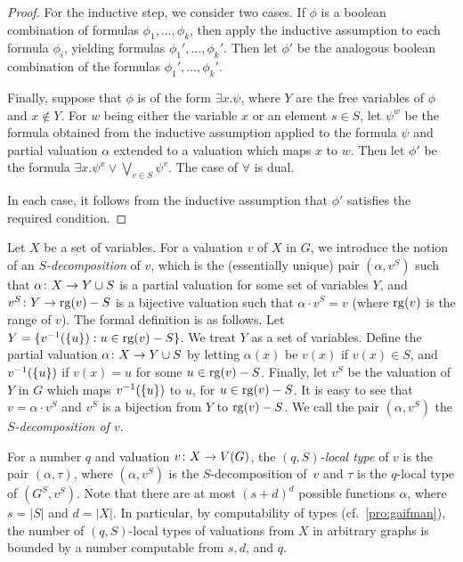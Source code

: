 \begin{proof}
For the inductive step, we consider two cases.
If $\phi$ is a boolean combination of formulas $\phi_1,\ldots,\phi_k$, then 
apply the inductive assumption to each formula $\phi_i$,
yielding formulas $\phi_1',\ldots,\phi_k'$. Then let $\phi'$ be the analogous boolean combination of the formulas $\phi_1',\ldots,\phi_k'$.

Finally, suppose that $\phi$ is of the form $\exists x.\psi$, where   $Y$ are the free variables of $\phi$ and $x\not \in Y$.
 For $w$ being either the variable $x$ 
or an element $s\in S$, 
let $\psi^w$ be the formula obtained from the inductive assumption applied to the formula $\psi$ 
and partial valuation $\alpha$ extended to a valuation which maps  $x$ to $w$. 
Then let $\phi'$
be the formula $\exists x.\psi^x \lor \bigvee_{v\in S}\psi^v$.
The case of $\forall$ is dual.

In each case, it follows from the inductive assumption that $\phi'$ 
satisfies the required condition.
\end{proof}



Let $X$ be a set of variables.
For a valuation  $v$ of $X$ in $G$, we introduce the notion of an \emph{$S$-decomposition} of $v$,  
which is the (essentially unique) pair $(\alpha,v^S)$
such that $\alpha\colon X\to Y\cup S$ is a partial valuation
for some set of variables $Y$,
and $v^S\colon Y\to \mathrm{rg}(v)-S$ is a bijective valuation such that 
$\alpha\cdot v^S=v$ (where $\mathrm{rg}(v)$ is the range of $v$). The formal definition is as follows.
Let $Y=\{v^{-1}(\{u\}): u\in \mathrm{rg}(v)-S\}$. We treat $Y$ as a set of variables. 
Define the partial valuation $\alpha\colon X\to Y\cup S$
by letting $\alpha(x)$ be $v(x)$ if $v(x)\in S$,
and $v^{-1}(\{u\})$ if $v(x)=u$ for some $u\in \mathrm{rg}(v)-S$.
Finally, let $v^S$ be the valuation of $Y$ in $G$ which
maps  $v^{-1}(\{u\})$ to $u$, for $u\in \mathrm{rg}(v)-S$.
It is easy to see that $v=\alpha\cdot v^S$ and $v^S$ is a bijection from $Y$ 
to $\mathrm{rg}(v)-S$. We call the pair $(\alpha,v^S)$ the \emph{$S$-decomposition of $v$}.



For a number $q$ and valuation $v\colon X \to V(G)$, the \emph{$(q,S)$-local type} of $v$ 
is the pair $(\alpha,\tau)$,
where $(\alpha,v^S)$ is the $S$-decomposition of~$v$
and $\tau$ is the $q$-local type of   $(G^S,v^S)$.
Note that there are at most  $(s+d)^d$ possible functions $\alpha$, where $s=|S|$ and $d=|X|$. In particular, by computability of types (cf.~\cref{pro:gaifman}), 
the number of $(q,S)$-local types of valuations from $X$
in arbitrary graphs is bounded by 
a number computable from $s,d$, and $q$.




